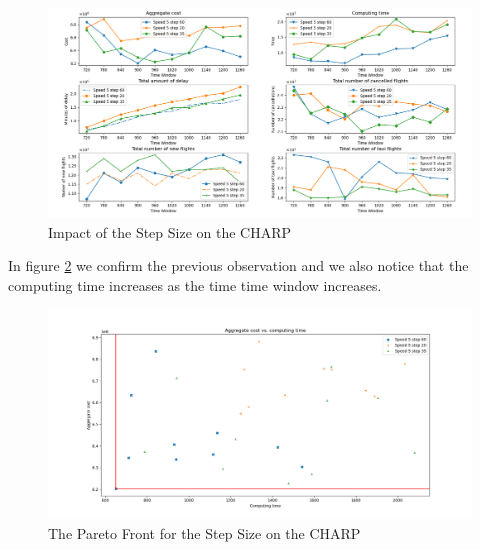 	\begin{figure}[h!]
		\centering
		\includegraphics[width=\textwidth]{figures/speed5Step.png}
		\caption[]{Impact of the Step Size on the CHARP}
		\label{fig:speed5Step}
	\end{figure}

In figure \ref{fig:costTimeStep} we confirm the previous observation and we also notice that the computing time increases as the time time window increases.

	\begin{figure}[h!]
		\centering
		\includegraphics[width=\textwidth]{figures/costTimeStep.png}
		\caption[]{The Pareto Front for the Step Size on the CHARP}
		\label{fig:costTimeStep}
	\end{figure}